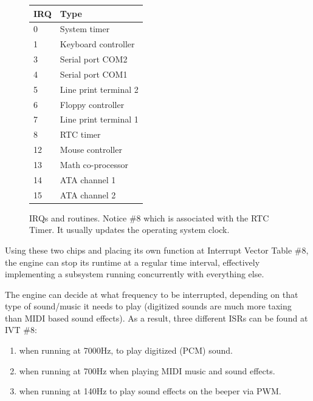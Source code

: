 \par
\begin{figure}[H]
\centering
\begin{tabularx}{\textwidth}{ X X  }
  \toprule
  \textbf{IRQ} & \textbf{Type} \\ \bottomrule
0 & System timer \\
1 & Keyboard controller \\
3 & Serial port COM2 \\ 
4 & Serial port COM1 \\
5 & Line print terminal 2 \\
6 & Floppy controller \\
7 & Line print terminal 1 \\
8 & RTC timer \\
12 & Mouse controller \\
13 & Math co-processor \\
14 & ATA channel 1 \\
15 & ATA channel 2  \\
\bottomrule
\end{tabularx}
\caption{IRQs and routines. Notice \#8 which is associated with the RTC Timer. It usually updates the operating system clock.}
\end{figure}
Using these two chips and placing its own function at Interrupt Vector Table \#8, the engine can stop its runtime at a regular time interval, effectively implementing a subsystem running concurrently with everything else.\\
\par
The engine can decide at what frequency to be interrupted, depending on that type of sound/music it needs to play (digitized sounds are much more taxing than MIDI based sound effects). As a result, three different ISRs can be found at IVT \#8: 
\begin{enumerate}
\item {} when running at 7000Hz, to play digitized (PCM) sound.
\item {} when running at 700Hz when playing MIDI music and sound effects.
\item {} when running at 140Hz to play sound effects on the beeper via PWM.
\end{enumerate}
\par



